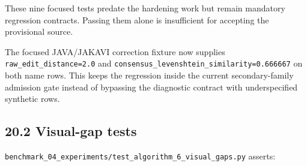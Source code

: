 These nine focused tests predate the hardening work but remain mandatory regression contracts. Passing them alone is insufficient for accepting the provisional source.

The focused JAVA/JAKAVI correction fixture now supplies \texttt{raw\_\allowbreak{}edit\_\allowbreak{}distance=2.0} and \texttt{consensus\_\allowbreak{}levenshtein\_\allowbreak{}similarity=0.666667} on both name rows. This keeps the regression inside the current secondary-family admission gate instead of bypassing the diagnostic contract with underspecified synthetic rows.

\subsection{20.2 Visual-gap tests}\label{202-visual-gap-tests}

\texttt{benchmark\_\allowbreak{}04\_\allowbreak{}experiments/test\_\allowbreak{}algorithm\_\allowbreak{}6\_\allowbreak{}visual\_\allowbreak{}gaps.py} asserts:

